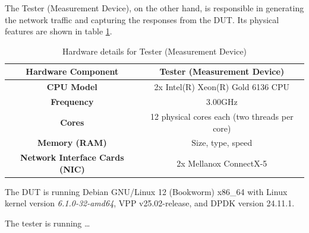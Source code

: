 The Tester (Measurement Device), on the other hand, is responsible in generating the network traffic and capturing the responses from the DUT.
Its physical features are shown in table \ref{tab:hardware_tester}. 

\begin{table}[h!]
\centering
\caption{Hardware details for Tester (Measurement Device)}
\begin{tabular}{|c|c|}
\hline
\textbf{Hardware Component} & \textbf{Tester (Measurement Device)} \\
\hline
\textbf{CPU Model} & 2x Intel(R) Xeon(R) Gold 6136 CPU \\
\hline
\textbf{Frequency} & 3.00GHz \\
\hline
\textbf{Cores} & 12 physical cores each (two threads per core)\\
\hline
\textbf{Memory (RAM)} & Size, type, speed \\
\hline
\textbf{Network Interface Cards (NIC)} & 2x Mellanox ConnectX-5 \\
\hline
\end{tabular}
\label{tab:hardware_tester}
\end{table}

The DUT is running Debian GNU/Linux 12 (Bookworm) x86\_64 with Linux kernel version \textit{6.1.0-32-amd64}, VPP v25.02-release, and DPDK version 24.11.1.

The tester is running \dots{}
